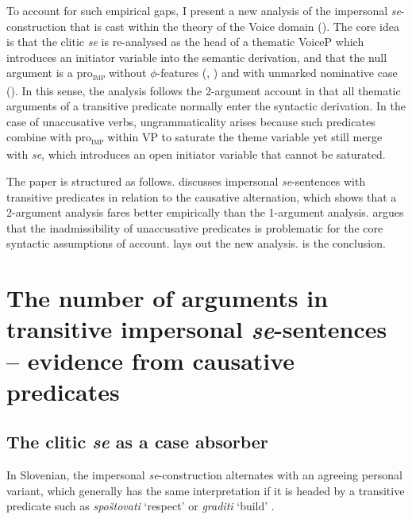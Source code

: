 \documentclass[output=paper,
modfonts,nonflat,
newtxmath
]{langsci/langscibook}
\begin{document}
To account for such empirical gaps, I present a new analysis of the impersonal \textit{se}-construction that is cast within the theory of the Voice domain (\citealt{schaffer2017}). The core idea is that the clitic \textit{se} is re-analysed as the head of a thematic VoiceP which introduces an initiator variable into the semantic derivation, and that the null argument is a pro\textsubscript{\textsc{imp}} without $\phi$-features (\citealt{Fenger2017}, \citealt{ackema2013, ackema2018})  and with unmarked nominative case (\citealt{kornfilt2015}). In this sense, the analysis follows the 2-argument account in that all thematic arguments of a transitive predicate normally enter the syntactic derivation. In the case of unaccusative verbs, ungrammaticality arises because such predicates combine with pro\textsubscript{\textsc{imp}} within VP to saturate the theme variable yet still merge with \textit{se}, which introduces an open initiator variable that cannot be saturated. \par

The paper is structured as follows.  discusses impersonal \textit{se}-sentences with transitive predicates in relation to the causative alternation, which shows that a 2-argument analysis fares better empirically than the 1-argument analysis.  argues that the inadmissibility of unaccusative predicates is problematic for the core syntactic assumptions of  account.  lays out the new analysis.  is the conclusion.

\section{The number of arguments in transitive impersonal \textit{se}-sentences – evidence from causative predicates} \label{sec2}

\subsection{The clitic \textit{se} as a case absorber}

In Slovenian, the impersonal \textit{se}-construction  alternates with an agreeing personal variant, which generally has the same interpretation if it is headed by a transitive predicate such as \textit{spoštovati} `respect' or \textit{graditi} `build' . 
\end{document}
